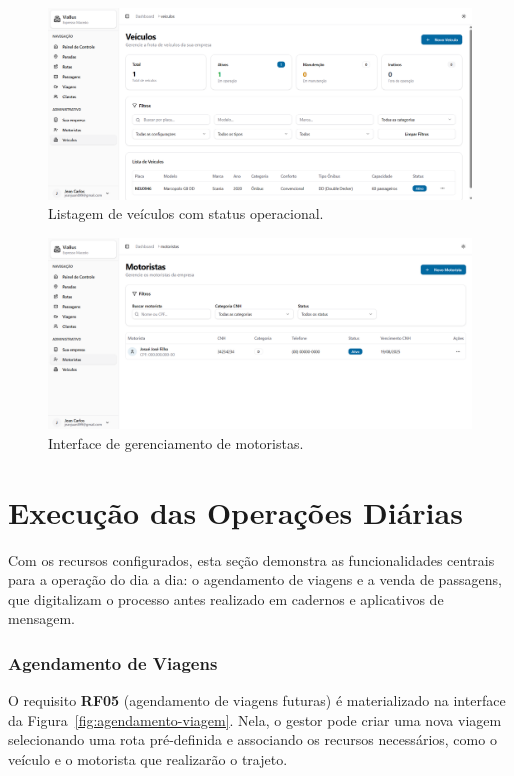 \begin{figure}[H]
  \centering
  \includegraphics[width=1\textwidth]{imagens/veiculos.png}
  \caption{Listagem de veículos com status operacional.}
  \label{fig:veiculos}
\end{figure}

\begin{figure}[H]
  \centering
  \includegraphics[width=1\textwidth]{imagens/motoristas.png}
  \caption{Interface de gerenciamento de motoristas.}
  \label{fig:motoristas}
\end{figure}

\section{Execução das Operações Diárias}

Com os recursos configurados, esta seção demonstra as funcionalidades centrais para a operação do dia a dia: o agendamento de viagens e a venda de passagens, que digitalizam o processo antes realizado em cadernos e aplicativos de mensagem.

\subsubsection{Agendamento de Viagens}
O requisito \textbf{RF05} (agendamento de viagens futuras) é materializado na interface da Figura~\ref{fig:agendamento-viagem}. Nela, o gestor pode criar uma nova viagem selecionando uma rota pré-definida e associando os recursos necessários, como o veículo e o motorista que realizarão o trajeto.

